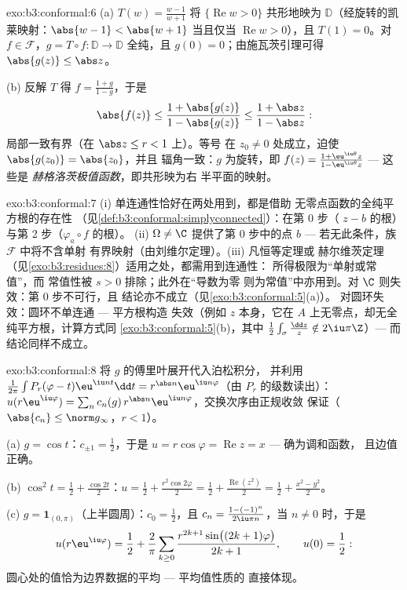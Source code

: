 \begin{solution}{exo:b3:conformal:6}
(a) $T(w) = \frac{w - 1}{w + 1}$ 将 $\{\operatorname{Re}w >
0\}$ 共形地映为 $\mathbb D$（经旋转的凯莱映射：$\abs{w -
1} < \abs{w + 1}$ 当且仅当 $\operatorname{Re}w > 0$），且 $T(1) =
0$。对 $f \in \mathcal F$，$g = T\circ f\colon \mathbb D \to
\mathbb D$ 全纯，且 $g(0) = 0$；由施瓦茨引理可得
$\abs{g(z)} \leq \abs z$。

(b) 反解 $T$ 得 $f = \frac{1 + g}{1 - g}$，于是
\[
\abs{f(z)} \leq \frac{1 + \abs{g(z)}}{1 - \abs{g(z)}}
\leq \frac{1 + \abs z}{1 - \abs z} :
\]
局部一致有界（在 $\abs z \leq r < 1$ 上）。等号
在 $z_0 \neq 0$ 处成立，迫使 $\abs{g(z_0)} = \abs{z_0}$，并且
辐角一致：$g$ 为旋转，即 $f(z) = \frac{1 +
\eu^{\iu\theta}z}{1 - \eu^{\iu\theta}z}$ --- 这些是
\emph{赫格洛茨极值函数}，即共形映为右
半平面的映射。
\end{solution}

\begin{solution}{exo:b3:conformal:7}
(i) 单连通性恰好在两处用到，都是借助
无零点函数的全纯平方根的存在性
（见\cref{def:b3:conformal:simplyconnected}）：在第 0 步（
$z - b$ 的根）与第 2 步（$\varphi_a\circ f$ 的根）。
(ii) $\Omega \neq \C$ 提供了第 0 步中的点 $b$ ---
若无此条件，族 $\mathcal F$ 中将不含单射
有界映射（由刘维尔定理）。(iii) 凡恒等定理或
赫尔维茨定理（见\cref{exo:b3:residues:8}）适用之处，都需用到连通性：
所得极限为“单射或常值”，而
常值性被 $s > 0$ 排除；此外在“导数为零
则为常值”中亦用到。对 $\C$ 则失效：第 0 步不可行，且
结论亦不成立（见\cref{exo:b3:conformal:5}(a)）。
对圆环失效：圆环不单连通 --- 平方根构造
失效（例如 $z$ 本身，它在
$A$ 上无零点，却无全纯平方根，计算方式同
\cref{exo:b3:conformal:5}(b)，其中
$\frac12\int_\sigma\frac{\dd z}z \notin 2\iu\pi\Z$）--- 而
结论同样不成立。
\end{solution}

\begin{solution}{exo:b3:conformal:8}
将 $g$ 的傅里叶展开代入泊松积分，
并利用
$\frac1{2\pi}\int P_r(\varphi - t)\eu^{\iu nt}\dd t =
r^{\abs n}\eu^{\iu n\varphi}$（由 $P_r$ 的级数读出）：
$u(r\eu^{\iu\varphi}) = \sum_nc_n(g)\,r^{\abs
n}\eu^{\iu n\varphi}$，交换次序由正规收敛
保证（$\abs{c_n} \leq \norm g_\infty$，$r < 1$）。

(a) $g = \cos t$：$c_{\pm1} = \frac12$，于是 $u =
r\cos\varphi = \operatorname{Re}z = x$ --- 确为调和函数，
且边值正确。

(b) $\cos^2t = \frac12 + \frac{\cos 2t}2$：$u = \frac12 +
\frac{r^2\cos2\varphi}2 = \frac12 +
\frac{\operatorname{Re}(z^2)}2 = \frac12 + \frac{x^2 -
y^2}{2}$。

(c) $g = \mathbf 1_{(0,\pi)}$（上半圆周）：$c_0 =
\frac12$，且 $c_n = \frac{1 - (-1)^n}{2\iu\pi n}$，当 $n \neq
0$ 时，于是
\[
u(r\eu^{\iu\varphi}) = \frac12 + \frac2\pi\sum_{k\geq0}
\frac{r^{2k+1}\sin\bigl((2k+1)\varphi\bigr)}{2k + 1},
\qquad u(0) = \frac12 :
\]
圆心处的值恰为边界数据的平均 --- 平均值性质的
直接体现。
\end{solution}

